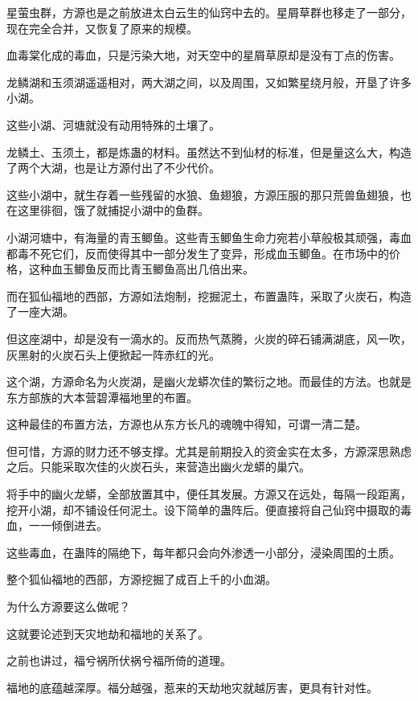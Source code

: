 
\begin{this_body}

星萤虫群，方源也是之前放进太白云生的仙窍中去的。星屑草群也移走了一部分，现在完全合并，又恢复了原来的规模。

血毒棠化成的毒血，只是污染大地，对天空中的星屑草原却是没有丁点的伤害。

龙鳞湖和玉须湖遥遥相对，两大湖之间，以及周围，又如繁星绕月般，开垦了许多小湖。

这些小湖、河塘就没有动用特殊的土壤了。

龙鳞土、玉须土，都是炼蛊的材料。虽然达不到仙材的标准，但是量这么大，构造了两个大湖，也是让方源付出了不少代价。

这些小湖中，就生存着一些残留的水狼、鱼翅狼，方源压服的那只荒兽鱼翅狼，也在这里徘徊，饿了就捕捉小湖中的鱼群。

小湖河塘中，有海量的青玉鲫鱼。这些青玉鲫鱼生命力宛若小草般极其顽强，毒血都毒不死它们，反而使得其中一部分发生了变异，形成血玉鲫鱼。在市场中的价格，这种血玉鲫鱼反而比青玉鲫鱼高出几倍出来。

而在狐仙福地的西部，方源如法炮制，挖掘泥土，布置蛊阵，采取了火炭石，构造了一座大湖。

但这座湖中，却是没有一滴水的。反而热气蒸腾，火炭的碎石铺满湖底，风一吹，灰黑射的火炭石头上便掀起一阵赤红的光。

这个湖，方源命名为火炭湖，是幽火龙蟒次佳的繁衍之地。而最佳的方法。也就是东方部族的大本营碧潭福地里的布置。

这种最佳的布置方法，方源也从东方长凡的魂魄中得知，可谓一清二楚。

但可惜，方源的财力还不够支撑。尤其是前期投入的资金实在太多，方源深思熟虑之后。只能采取次佳的火炭石头，来营造出幽火龙蟒的巢穴。

将手中的幽火龙蟒，全部放置其中，便任其发展。方源又在远处，每隔一段距离，挖开小湖，却不铺设任何泥土。设下简单的蛊阵后。便直接将自己仙窍中摄取的毒血，一一倾倒进去。

这些毒血，在蛊阵的隔绝下，每年都只会向外渗透一小部分，浸染周围的土质。

整个狐仙福地的西部，方源挖掘了成百上千的小血湖。

为什么方源要这么做呢？

这就要论述到天灾地劫和福地的关系了。

之前也讲过，福兮祸所伏祸兮福所倚的道理。

福地的底蕴越深厚。福分越强，惹来的天劫地灾就越厉害，更具有针对性。


\end{this_body}
